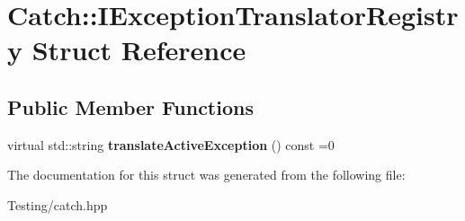 \hypertarget{struct_catch_1_1_i_exception_translator_registry}{\section{Catch\-:\-:I\-Exception\-Translator\-Registry Struct Reference}
\label{struct_catch_1_1_i_exception_translator_registry}
}
\subsection*{Public Member Functions}
\begin{DoxyCompactItemize}
\item 
\hypertarget{struct_catch_1_1_i_exception_translator_registry_af76ae8c331a17f2a94c9720bc0d686bb}{virtual std\-::string {\bfseries translate\-Active\-Exception} () const =0}\label{struct_catch_1_1_i_exception_translator_registry_af76ae8c331a17f2a94c9720bc0d686bb}

\end{DoxyCompactItemize}


The documentation for this struct was generated from the following file\-:\begin{DoxyCompactItemize}
\item 
Testing/catch.\-hpp\end{DoxyCompactItemize}
